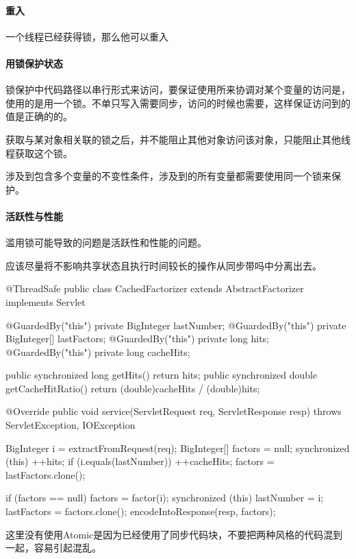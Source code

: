 \paragraph{重入}一个线程已经获得锁，那么他可以重入

\paragraph{用锁保护状态}锁保护中代码路径以串行形式来访问，要保证使用所来协调对某个变量的访问是，使用的是用一个锁。不单只写入需要同步，访问的时候也需要，这样保证访问到的值是正确的的。

获取与某对象相关联的锁之后，并不能阻止其他对象访问该对象，只能阻止其他线程获取这个锁。

涉及到包含多个变量的不变性条件，涉及到的所有变量都需要使用同一个锁来保护。

\paragraph{活跃性与性能}滥用锁可能导致的问题是活跃性和性能的问题。

应该尽量将不影响共享状态且执行时间较长的操作从同步带吗中分离出去。

\begin{Java}
@ThreadSafe
public class CachedFactorizer extends AbstractFactorizer implements Servlet {
	
	@GuardedBy("this") private BigInteger lastNumber;
	@GuardedBy("this") private BigInteger[] lastFactors;
	@GuardedBy("this") private long hits;
	@GuardedBy("this") private long cacheHits;

	public synchronized long getHits() {return hits;}
	public synchronized double getCacheHitRatio() {
		return (double)cacheHits / (double)hits;
	}
	
	@Override
	public void service(ServletRequest req, ServletResponse resp)
			throws ServletException, IOException {
		BigInteger i = extractFromRequest(req);
		BigInteger[] factors = null;
		synchronized (this) {
			++hits;
			if (i.equals(lastNumber)) {
				++cacheHits;
				factors = lastFactors.clone();
			} 
		}
		
		if (factors == null) {
			factors = factor(i);
			synchronized (this) {
				lastNumber = i;
				lastFactors = factors.clone();
			}
		}
		encodeIntoResponse(resp, factors);
	}

}
\end{Java}

这里没有使用Atomic是因为已经使用了同步代码块，不要把两种风格的代码混到一起，容易引起混乱。

